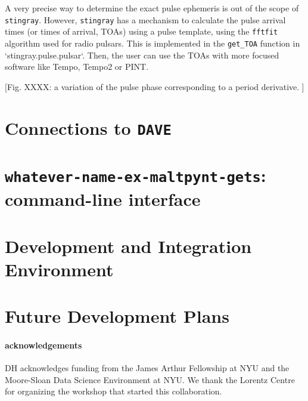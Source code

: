 \documentclass[12pt]{emulateapj}
\newcommand{\stingray}{\texttt{stingray}\xspace}
\newcommand{\maltpynt}{\texttt{whatever-name-ex-maltpynt-gets}\xspace}
\begin{document}
A very precise way to determine the exact pulse ephemeris is out of the scope of \stingray. 
However, \stingray has a mechanism to calculate the pulse arrival times (or times of arrival, TOAs) using a pulse template, using the \texttt{fftfit} algorithm used for radio pulsars. 
This is implemented in the \verb|get_TOA| function in `stingray.pulse.pulsar`.
Then, the user can use the TOAs with more focused software like Tempo, Tempo2 or PINT.

[Fig. XXXX: a variation of the pulse phase corresponding to a period derivative. ]

\section{Connections to \texttt{DAVE}}
\label{sec:dave}

\section{\maltpynt: command-line interface}
\label{sec:maltpynt}


\section{Development and Integration Environment}
\label{sec:development}

\section{Future Development Plans}
\label{sec:future}

\paragraph{acknowledgements}
DH acknowledges funding from the James Arthur Fellowship at NYU and the Moore-Sloan Data Science Environment at NYU. 
We thank the Lorentz Centre for organizing the workshop that started this collaboration.
\clearpage



\end{document}
